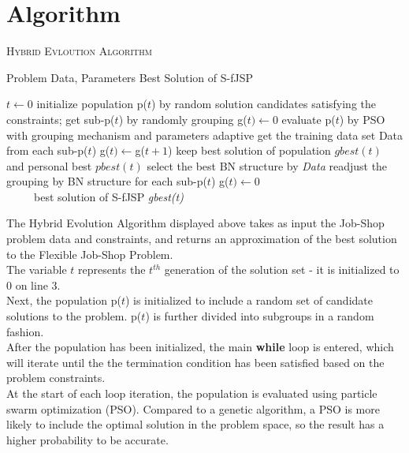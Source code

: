 \documentclass[11pt]{article}
\begin{document}
\newpage
\section{Algorithm}

\begin{algorithm}\caption{\textsc{Hybrid Evloution Algorithm}}
 \begin{algorithmic}[1]
    Problem Data, Parameters
    Best Solution of S-fJSP
   
   \State $t \gets 0$
   \State initialize population p($t$) by random solution candidates satisfying the constraints;
 get sub-p($t$) by randomly grouping
 	\State g($t) \gets 0$
	\State evaluate p($t$) by PSO with grouping mechanism and parameters adaptive
 	\State get the training data set Data from each sub-p($t$)
 	\State g($t) \gets $g($t + 1$)
 	\State keep best solution of population $gbest(t)$ and personal best $pbest(t)$
 	\State select the best BN structure by \textit{Data}
 	\State readjust the grouping by BN structure for each sub-p($t$)
 	\State g($t) \gets 0$
 	\EndIf
        \EndWhile\\
~~~~~\Return best solution of S-fJSP \textit{gbest(t)}
 \end{algorithmic}
\end{algorithm}

The Hybrid Evolution Algorithm displayed above takes as input the Job-Shop problem data and constraints, and returns an approximation of the best solution to the Flexible Job-Shop Problem.\\

The variable $t$ represents the $t^{th}$ generation of the solution set - it is initialized to 0 on line 3.\\

Next, the population p($t$) is initialized to include a random set of candidate solutions to the problem. p($t$) is further divided into subgroups in a random fashion.\\

After the population has been initialized, the main \textbf{while} loop is entered, which will iterate until the the termination condition has been satisfied based on the problem constraints.\\

At the start of each loop iteration, the population is evaluated using particle swarm optimization (PSO). Compared to a genetic algorithm, a PSO is more likely to include the optimal solution in the problem space, so the result has a higher probability to be accurate\cite{sun2015bayesian}.\\
\end{document}
